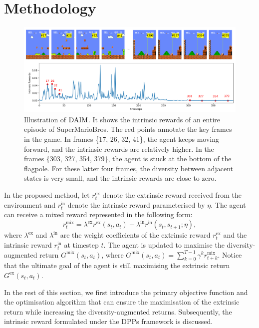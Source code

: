 \section{Methodology}
\begin{figure}[t]
    \centering
    \includegraphics[width=\linewidth]{figures/chapter5/illustration.pdf}
    \caption[Illustration of $\ourmethod$.]{Illustration of $\ourmethod$. It shows the intrinsic rewards of an entire episode of SuperMarioBros. The red points annotate the key frames in the game. In frames \{17, 26, 32, 41\}, the agent keeps moving forward, and the intrinsic rewards are relatively higher. In the frames \{303, 327, 354, 379\}, the agent is stuck at the bottom of the flagpole. For these latter four frames, the diversity between adjacent states is very small, and the intrinsic rewards are close to zero.}
    \label{fig:illustration}
\end{figure}

In the proposed method, let $r_{t}^{\text{ex}}$ denote the extrinsic reward received from the environment and $r^{\text{in}}_{t}$ denote the intrinsic reward parameterised by $\eta$. The agent can receive a mixed reward represented in the following form:
\begin{equation}
    r^{\text{mix}}_t = \lambda^{\text{ex}} r^{\text{ex}}(s_{t}, a_t) + \lambda^{\text{in}} r^{\text{in}}(s_t, s_{t+1};\eta),
\end{equation}
where $\lambda^{\text{ex}}$ and $\lambda^{\text{in}}$ are the weight coefficients of the extrinsic reward $r^{\text{ex}}_{t}$ and the intrinsic reward $r^{\text{in}}_{t}$ at timestep $t$. The agent is updated to maximise the diversity-augmented return $G^{\text{mix}}(s_t,a_t)$, where $G^{\text{mix}}(s_t,a_t) =\sum_{k=0}^{T-1}\gamma^{k}r^{\text{mix}}_{t+k}$. Notice that the ultimate goal of the agent is still maximising the extrinsic return $G^{\text{ex}}(s_{t}, a_{t})$. 

In the rest of this section, we first introduce the primary objective function and the optimisation algorithm that can ensure the maximisation of the extrinsic return while increasing the diversity-augmented returns. Subsequently, the intrinsic reward formulated under the DPPs framework is discussed.

